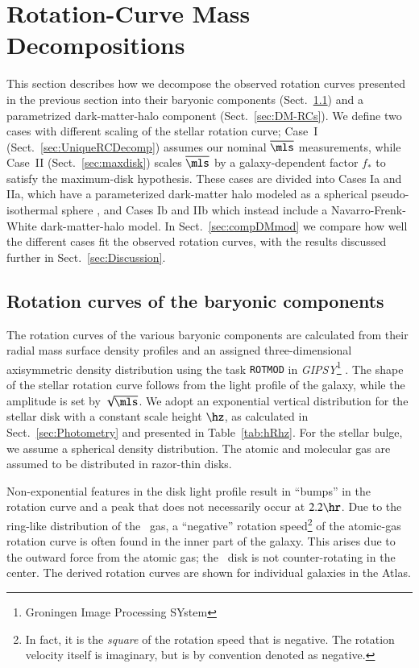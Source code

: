 \documentclass[traditabstract]{aa} %
\begin{document}
\section{Rotation-Curve Mass Decompositions}
\label{sec:RCDecomp}
This section describes how we decompose the observed rotation curves presented in the
previous section into their baryonic components (Sect.~\ref{sec:RCmod}) and a parametrized
dark-matter-halo component (Sect.~\ref{sec:DM-RCs}).
We define two cases with different scaling of the stellar rotation curve;
Case~I (Sect.~\ref{sec:UniqueRCDecomp}) assumes our nominal $\overline{\mls}$
measurements, while Case~II (Sect.~\ref{sec:maxdisk}) scales $\overline{\mls}$ by a
galaxy-dependent factor $f_{\ast}$ to satisfy the maximum-disk hypothesis. These cases are
divided into Cases Ia and IIa, which have a parameterized dark-matter halo modeled as a
spherical pseudo-isothermal sphere \citep[pISO; e.g.,][]{ostriker1979,schmidt1985,kent1986},
and Cases Ib and IIb which instead include a Navarro-Frenk-White 
\citep[NFW;][]{NFW1997} dark-matter-halo model.
In Sect.~\ref{sec:compDMmod} we compare how well the different cases fit the observed
rotation curves, with the results discussed further in Sect.~\ref{sec:Discussion}.


\subsection{Rotation curves of the baryonic components}
\label{sec:RCmod}
The rotation curves of the various baryonic components are calculated from their radial 
mass surface density profiles and an assigned three-dimensional axisymmetric density 
distribution using the task {\tt ROTMOD} in {\it GIPSY}\footnote{Groningen Image
Processing SYstem} \citep{hulst1992,vogelaar2001}.
The shape of the stellar rotation curve follows from the light profile of the galaxy,
while the amplitude is set by $\sqrt{\mls}$.
We adopt an exponential vertical distribution for the stellar disk with a constant scale
height $\hz$, as calculated in Sect.~\ref{sec:Photometry} and presented in
Table~\ref{tab:hRhz}. For the stellar bulge, we assume a spherical density distribution.
The atomic and molecular gas are assumed to be distributed in razor-thin disks.

Non-exponential features in the disk light profile result in ``bumps'' in the rotation
curve and a peak that does not necessarily occur at $2.2\hr$. Due to the ring-like
distribution of the \hone\ gas, a ``negative'' rotation speed\footnote{In fact, it is the
{\it square} of the rotation speed that is negative. The rotation velocity itself is
imaginary, but is by convention denoted as negative.} of the atomic-gas rotation curve is
often found in the inner part of the galaxy. This arises due to the outward force from the
atomic gas; the \hone\ disk is not counter-rotating in the center. The derived rotation
curves are shown for individual galaxies in the Atlas.
\end{document}
